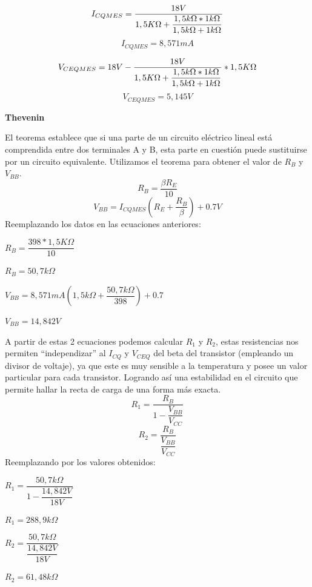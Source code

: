 \documentclass[12pt]{article}
\begin{document}
\begin{equation}
\label{I_{CQMES}}
I_{CQMES}=\dfrac{18V}{1,5K\Omega+\dfrac{1,5k\Omega*1k\Omega}{1,5k\Omega+1k\Omega}}
\end{equation}
\vspace{0.2cm}
\begin{equation}
I_{CQMES}=8,571mA
\end{equation}

\begin{equation}
\label{V_{CEQMES}}
V_{CEQMES}=18V-\dfrac{18V}{1,5K\Omega+\dfrac{1,5k\Omega*1k\Omega}{1,5k\Omega+1k\Omega}}*1,5K\Omega
\end{equation}
\vspace{0.2cm}
\begin{equation}
V_{CEQMES}=5,145V 
\end{equation}

\newpage
\textbf{Thevenin}

El teorema establece que si una parte de un circuito eléctrico lineal está comprendida entre dos terminales A y B, esta parte en cuestión puede sustituirse por un circuito equivalente.
Utilizamos el teorema para obtener el valor de $R_B$ y $V_{BB}$.
\begin{equation}
 R_B=\dfrac{\beta R_E}{10}
\end{equation}
\begin{equation}
 V_{BB}=I_{CQMES}(R_E+\dfrac{R_B}{\beta})+0.7V
\end{equation}
Reemplazando los datos en las ecuaciones anteriores:
\begin{center}
$R_B=\dfrac{398*1,5K\Omega}{10}$

$R_B=50,7k\Omega$

\vspace{0.8 cm}
$V_{BB}=8,571mA(1,5k\Omega+\dfrac{50,7k\Omega}{398})+0.7$

$V_{BB}=14,842V$
\end{center}
\vspace{1 cm}
A partir de estas 2 ecuaciones podemos calcular $R_1$ y $R_2$,  estas resistencias nos permiten “independizar” al $I_{CQ}$ y $V_{CEQ}$ del beta del transistor (empleando un divisor de voltaje), ya que este es muy sensible a la temperatura y posee un valor particular para cada transistor. Logrando así una estabilidad en el circuito que permite hallar la recta de carga de una forma más exacta.
\begin{equation}
\label{R1}
 R_1=\frac{R_B}{1-\dfrac{V_{BB}}{V_{CC}}}
\end{equation}
\begin{equation}
\label{R2}
 R_2=\frac{R_B}{\dfrac{V_{BB}}{V_{CC}}}
\end{equation}
\vspace{0.5cm}
Reemplazando por los valores obtenidos:
\begin{center}
 
$R_1=\dfrac{50,7k\Omega}{1-\dfrac{14,842V}{18V}}$

$R_1=288,9k\Omega$

\vspace{0.8 cm}
$R_2=\dfrac{50,7k\Omega}{\dfrac{14,842V}{18V}}$

$R_2=61,48k\Omega$
\end{center}
\end{document}
